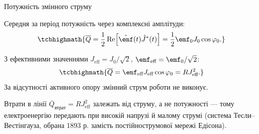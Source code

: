 \documentclass[onlytextwidth]{beamer}
\begin{document}
\begin{frame}{Потужність змінного струму}{}
	\begin{block}{}\justifying
		Середня за період потужність через комплексні амплітуди:
		\begin{equation*}
			\tcbhighmath{
				\overline Q = \frac12\operatorname{Re}\!\left[\hat\emf(t)\hat J^*(t)\right]
				= \frac12\emf_0J_0\cos\varphi_0.
			}
		\end{equation*}
	\end{block}
	\begin{block}{}\justifying
		З ефективними значеннями $J_{\text{eff}} = J_0/\sqrt2$, $\emf_{\text{eff}}=\emf_0/\sqrt2$:
		\begin{equation*}
			\tcbhighmath{
				\overline Q = \emf_{\text{eff}}J_{\text{eff}}\cos\varphi_0 = RJ_{\text{eff}}^2.
			}
		\end{equation*}
		За відсутності активного опору змінний струм роботи не виконує.
	\end{block}
	\begin{exampleblock}{}\justifying\small
		Втрати в лінії $\overline Q_{\text{втрат}}=RJ_{\text{eff}}^2$ залежать від струму, а не потужності --- тому електроенергію передають при високій напрузі й малому струмі (система Тесли--Вестінгауза, обрана 1893 р. замість постійнострумової мережі Едісона).
	\end{exampleblock}
\end{frame}
\end{document}
